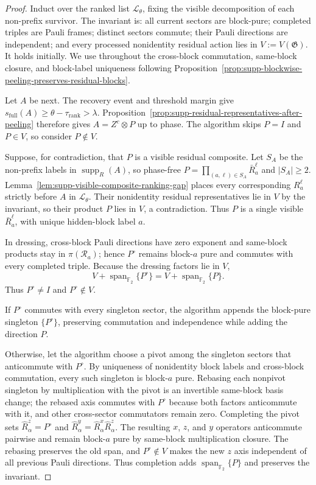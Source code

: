 \documentclass[
  aps,
  prx,
  reprint,
  superscriptaddress,
  amsmath,
  amssymb,
  nofootinbib,
  longbibliography
]{revtex4-2}
\newcommand{\supp}{\operatorname{supp}}
\newcommand{\Span}{\operatorname{span}}
\newcommand{\Fc}{\mathbb{F}_2}
\begin{document}
\begin{proof}
Induct over the ranked list $\mathcal L_\theta$, fixing the visible
decomposition of each non-prefix survivor.  The invariant is: all current
sectors are block-pure; completed triples are Pauli frames; distinct sectors
commute; their Pauli directions are independent; and every processed nonidentity residual
action lies in $V:=V(\mathfrak G)$.  It holds initially.  We use throughout
the cross-block commutation, same-block closure, and block-label uniqueness
following
Proposition~\ref{prop:supp-blockwise-peeling-preserves-residual-blocks}.

Let $A$ be next.  The recovery event and threshold margin give
$s_{\mathrm{full}}(A)\ge\theta-\tau_{\mathrm{rank}}>\lambda$.
Proposition~\ref{prop:supp-residual-representatives-after-peeling}
therefore gives $A=Z^c\otimes P$ up to phase.  The algorithm skips $P=I$
and $P\in V$, so consider $P\notin V$.

Suppose, for contradiction, that $P$ is a visible residual composite.
Let $S_A$ be the non-prefix labels in $\supp_R(A)$, so phase-free
$P=\prod_{(a,\ell)\in S_A}\bar R_a^\ell$ and $|S_A|\ge2$.
Lemma~\ref{lem:supp-visible-composite-ranking-gap} places every corresponding
$R_a^\ell$ strictly before $A$ in $\mathcal L_\theta$.  Their nonidentity
residual representatives lie in $V$ by the invariant, so their product
$P$ lies in $V$, a contradiction.  Thus $P$ is a single visible
$\bar R_a^\ell$, with unique hidden-block label $a$.

In dressing, cross-block Pauli directions have zero exponent and same-block products stay
in $\pi(\mathcal R_a)$; hence $P^\circ$ remains block-$a$ pure and commutes
with every completed triple.  Because the dressing factors lie in $V$,
\begin{equation}
V+\Span_{\Fc}\{P^\circ\}
=
V+\Span_{\Fc}\{P\}.
\end{equation}
Thus $P^\circ\ne I$ and $P^\circ\notin V$.

If $P^\circ$ commutes with every singleton sector, the algorithm appends
the block-pure singleton $\{P^\circ\}$, preserving commutation and
independence while adding the direction $P$.

Otherwise, let the algorithm choose a pivot among the singleton sectors
that anticommute with $P^\circ$.  By uniqueness of nonidentity block
labels and cross-block commutation, every such singleton is block-$a$
pure.  Rebasing each nonpivot singleton by multiplication with the pivot
is an invertible same-block basis change; the rebased axis commutes with
$P^\circ$ because both factors anticommute with it, and other cross-sector
commutators remain zero.  Completing the pivot sets
$\hat R_\alpha^z=P^\circ$ and
$\hat R_\alpha^y=\hat R_\alpha^x\hat R_\alpha^z$.  The resulting
$x$, $z$, and $y$ operators anticommute pairwise and remain block-$a$
pure by same-block multiplication closure.  The rebasing preserves the
old span, and $P^\circ\notin V$ makes the new $z$ axis independent of all
previous Pauli directions.  Thus completion adds $\Span_{\Fc}\{P\}$ and preserves the
invariant.


\end{proof}
\end{document}
